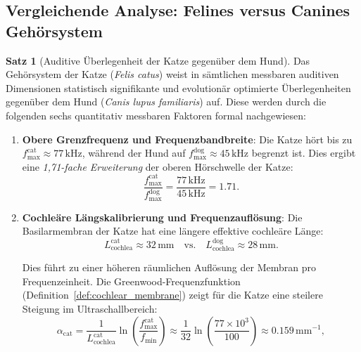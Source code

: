 ﻿\documentclass[12pt, a4paper]{article}
\theoremstyle{definition}
\newtheorem{satz}{Satz}[section]
\theoremstyle{remark}
\begin{document}
\subsection{Vergleichende Analyse: Felines versus Canines Gehörsystem}

\begin{satz}[Auditive Überlegenheit der Katze gegenüber dem Hund]
\label{satz:cat_superior_to_dog}
Das Gehörsystem der Katze (\emph{Felis catus}) weist in sämtlichen messbaren auditiven Dimensionen statistisch signifikante und evolutionär optimierte Überlegenheiten gegenüber dem Hund (\emph{Canis lupus familiaris}) auf. Diese werden durch die folgenden sechs quantitativ messbaren Faktoren formal nachgewiesen:

\begin{enumerate}

\item \textbf{Obere Grenzfrequenz und Frequenzbandbreite}: 
Die Katze hört bis zu $f_{\max}^{\mathrm{cat}} \approx 77\,\mathrm{kHz}$, während der Hund auf $f_{\max}^{\mathrm{dog}} \approx 45\,\mathrm{kHz}$ begrenzt ist. Dies ergibt eine \emph{1,71-fache Erweiterung} der oberen Hörschwelle der Katze:
\begin{equation}
\frac{f_{\max}^{\mathrm{cat}}}{f_{\max}^{\mathrm{dog}}} = \frac{77\,\mathrm{kHz}}{45\,\mathrm{kHz}} = 1.71.
\label{eq:fmax_comparison_cat_dog}
\end{equation}

\item \textbf{Cochleäre Längskalibrierung und Frequenzauflösung}: 
Die Basilarmembran der Katze hat eine längere effektive cochleäre Länge:
\begin{equation}
L_{\text{cochlea}}^{\mathrm{cat}} \approx 32\,\mathrm{mm} \quad \text{vs.} \quad L_{\text{cochlea}}^{\mathrm{dog}} \approx 28\,\mathrm{mm}.
\label{eq:cochlea_length}
\end{equation}

Dies führt zu einer höheren räumlichen Auflösung der Membran pro Frequenzeinheit. Die Greenwood-Frequenzfunktion (Definition~\ref{def:cochlear_membrane}) zeigt für die Katze eine steilere Steigung im Ultraschallbereich:
\begin{equation}
\alpha_{\text{cat}} = \frac{1}{L_{\text{cochlea}}^{\mathrm{cat}}}\ln\left(\frac{f_{\max}^{\mathrm{cat}}}{f_{\min}}\right) \approx \frac{1}{32}\ln\left(\frac{77 \times 10^3}{100}\right) \approx 0.159\,\mathrm{mm}^{-1},
\label{eq:alpha_cat}
\end{equation}


\end{enumerate}
\end{satz}
\end{document}
